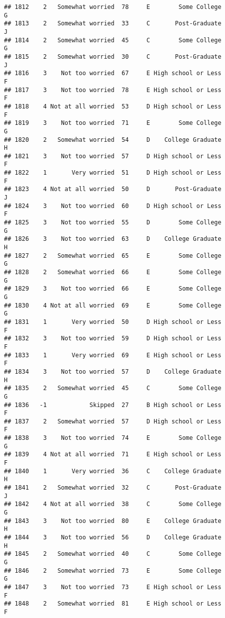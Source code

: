 \documentclass[
]{article}
\begin{document}
\begin{verbatim}
## 1812    2   Somewhat worried  78     E        Some College         G
## 1813    2   Somewhat worried  33     C       Post-Graduate         J
## 1814    2   Somewhat worried  45     C        Some College         G
## 1815    2   Somewhat worried  30     C       Post-Graduate         J
## 1816    3    Not too worried  67     E High school or Less         F
## 1817    3    Not too worried  78     E High school or Less         F
## 1818    4 Not at all worried  53     D High school or Less         F
## 1819    3    Not too worried  71     E        Some College         G
## 1820    2   Somewhat worried  54     D    College Graduate         H
## 1821    3    Not too worried  57     D High school or Less         F
## 1822    1       Very worried  51     D High school or Less         F
## 1823    4 Not at all worried  50     D       Post-Graduate         J
## 1824    3    Not too worried  60     D High school or Less         F
## 1825    3    Not too worried  55     D        Some College         G
## 1826    3    Not too worried  63     D    College Graduate         H
## 1827    2   Somewhat worried  65     E        Some College         G
## 1828    2   Somewhat worried  66     E        Some College         G
## 1829    3    Not too worried  66     E        Some College         G
## 1830    4 Not at all worried  69     E        Some College         G
## 1831    1       Very worried  50     D High school or Less         F
## 1832    3    Not too worried  59     D High school or Less         F
## 1833    1       Very worried  69     E High school or Less         F
## 1834    3    Not too worried  57     D    College Graduate         H
## 1835    2   Somewhat worried  45     C        Some College         G
## 1836   -1            Skipped  27     B High school or Less         F
## 1837    2   Somewhat worried  57     D High school or Less         F
## 1838    3    Not too worried  74     E        Some College         G
## 1839    4 Not at all worried  71     E High school or Less         F
## 1840    1       Very worried  36     C    College Graduate         H
## 1841    2   Somewhat worried  32     C       Post-Graduate         J
## 1842    4 Not at all worried  38     C        Some College         G
## 1843    3    Not too worried  80     E    College Graduate         H
## 1844    3    Not too worried  56     D    College Graduate         H
## 1845    2   Somewhat worried  40     C        Some College         G
## 1846    2   Somewhat worried  73     E        Some College         G
## 1847    3    Not too worried  73     E High school or Less         F
## 1848    2   Somewhat worried  81     E High school or Less         F

\end{verbatim}
\end{document}
